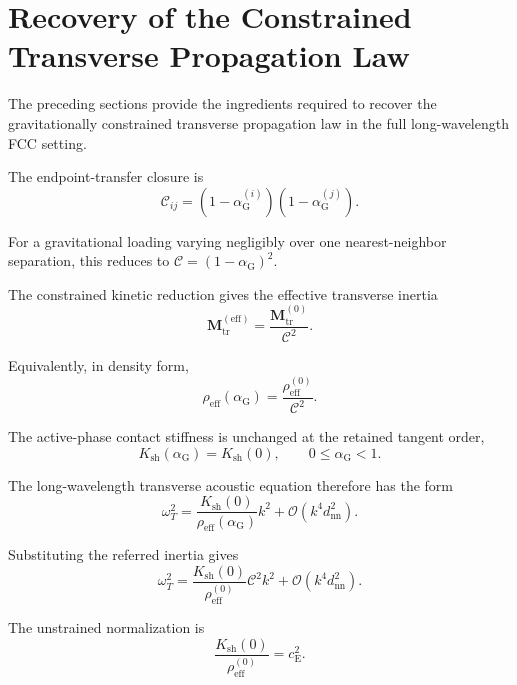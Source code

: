 \section{Recovery of the Constrained Transverse Propagation Law}

The preceding sections provide the ingredients required to recover the gravitationally constrained transverse propagation law in the full long-wavelength FCC setting.

The endpoint-transfer closure is
\begin{equation}
    \mathcal{C}_{ij} = (1-\alpha_{\mathrm{G}}^{(i)}) (1-\alpha_{\mathrm{G}}^{(j)}).
\end{equation}

For a gravitational loading varying negligibly over one nearest-neighbor separation, this reduces to $\mathcal{C} = (1-\alpha_{\mathrm{G}})^2$.

The constrained kinetic reduction gives the effective transverse inertia
\begin{equation}
    \mathbf{M}_{\mathrm{tr}}^{(\mathrm{eff})} = \frac{\mathbf{M}_{\mathrm{tr}}^{(0)}}{\mathcal{C}^2}.
\end{equation}

Equivalently, in density form,
\begin{equation}
    \rho_{\mathrm{eff}}(\alpha_{\mathrm{G}}) = \frac{\rho_{\mathrm{eff}}^{(0)}}{\mathcal{C}^2}.
\end{equation}

The active-phase contact stiffness is unchanged at the retained tangent order,
\begin{equation}
    K_{\mathrm{sh}}(\alpha_{\mathrm{G}}) = K_{\mathrm{sh}}(0), \qquad 0 \leq \alpha_{\mathrm{G}} < 1.
\end{equation}

The long-wavelength transverse acoustic equation therefore has the form
\begin{equation}
    \omega_T^2 = \frac{K_{\mathrm{sh}}(0)}{\rho_{\mathrm{eff}}(\alpha_{\mathrm{G}})} k^2 + \mathcal{O}(k^4d_{\mathrm{nn}}^2).
\end{equation}

Substituting the referred inertia gives
\begin{equation}
    \omega_T^2 = \frac{K_{\mathrm{sh}}(0)}{\rho_{\mathrm{eff}}^{(0)}} \mathcal{C}^2k^2 + \mathcal{O}(k^4d_{\mathrm{nn}}^2).
\end{equation}

The unstrained normalization is
\begin{equation}
    \frac{K_{\mathrm{sh}}(0)}{\rho_{\mathrm{eff}}^{(0)}} = c_{\mathrm{E}}^2.
\end{equation}

